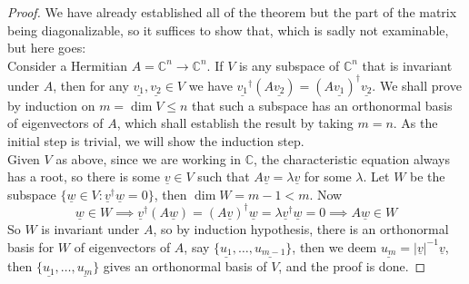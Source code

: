 \begin{proof}
    We have already established all of the theorem but the part of the matrix being diagonalizable, so it suffices to show that, which is sadly not examinable, but here goes:\\
    Consider a Hermitian $A=\mathbb C^n\to\mathbb C^n$.
    If $V$ is any subspace of $\mathbb C^n$ that is invariant under $A$, then for any $\underline{v_1},\underline{v_2}\in V$ we have $\underline{v_1}^\dagger (A\underline{v_2})=(A\underline{v_1})^\dagger\underline{v_2}$.
    We shall prove by induction on $m=\dim V\le n$ that such a subspace has an orthonormal basis of eigenvectors of $A$, which shall establish the result by taking $m=n$.
    As the initial step is trivial, we will show the induction step.\\
    Given $V$ as above, since we are working in $\mathbb C$, the characteristic equation always has a root, so there is some $\underline{v}\in V$ such that $A\underline{v}=\lambda\underline{v}$ for some $\lambda$.
    Let $W$ be the subspace $\{\underline{w}\in V:\underline{v}^\dagger\underline{w}=0\}$, then $\dim W=m-1<m$.
    Now
    $$\underline{w}\in W\implies \underline{v}^\dagger (A\underline{w})=(A\underline{v})^\dagger\underline{w}=\lambda\underline{v}^\dagger\underline{w}=0\implies A\underline{w}\in W$$
    So $W$ is invariant under $A$, so by induction hypothesis, there is an orthonormal basis for $W$ of eigenvectors of $A$, say $\{\underline{u_1},\ldots,\underline{u_{m-1}}\}$, then we deem $\underline{u_m}=|\underline{v}|^{-1}\underline{v}$, then $\{\underline{u_1},\ldots,\underline{u_m}\}$ gives an orthonormal basis of $V$, and the proof is done.
\end{proof}
